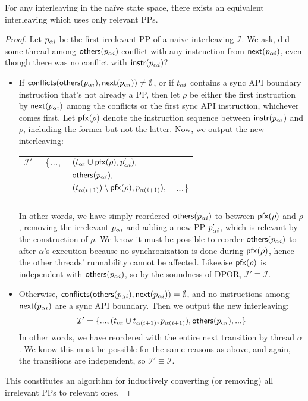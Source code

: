 \begin{lemma}
	For any interleaving in the na\"{i}ve state space, there exists an equivalent interleaving which uses only relevant PPs.
	\label{lem:equivalent}
\end{lemma}

\begin{proof}
	Let $p_{\alpha{}i}$ be the first irrelevant PP of a naive interleaving $\mathcal{I}$.
	We ask, did some thread among $\mathsf{others}(p_{\alpha{}i})$ conflict with any instruction from $\mathsf{next}(p_{\alpha{}i})$, even though there was no conflict with $\mathsf{instr}(p_{\alpha{}i})$?
	\begin{itemize}
		\item If $\mathsf{conflicts}(\mathsf{others}(p_{\alpha{}i}),\mathsf{next}(p_{\alpha{}i})) \ne \emptyset$, or if $t_{\alpha{}i}$ contains a sync API boundary instruction that's not already a PP,
			then let $\rho$ be either the first instruction by $\mathsf{next}(p_{\alpha{}i})$ among the conflicts or the first sync API instruction, whichever comes first.
			Let $\mathsf{pfx}(\rho)$ denote the instruction sequence between $\mathsf{instr}(p_{\alpha{}i})$ and $\rho$, including the former but not the latter.
			Now, we output the new interleaving:

			\begin{tabular}{lll}
				\\
				$\mathcal{I}' = \{...,$&$(t_{\alpha{}i} \cup \mathsf{pfx}(\rho), p_{\alpha{}i}'),$& \\
									   &$\mathsf{others}(p_{\alpha{}i}),$& \\
					       &$(t_{\alpha{}(i+1)}) \setminus \mathsf{pfx}(\rho), p_{\alpha{}(i+1)}),$ & $ ...\}$ \\
				\\
			\end{tabular}

			In other words, we have simply reordered $\mathsf{others}(p_{\alpha{}i})$ to between $\mathsf{pfx}(\rho)$ and $\rho$, removing the irrelevant $p_{\alpha{}i}$ and adding a new PP $p_{\alpha{}i}'$, which is relevant by the construction of $\rho$.
			We know it must be possible to reorder $\mathsf{others}(p_{\alpha{}i})$ to after $\alpha$'s execution because no synchronization is done during $\mathsf{pfx}(\rho)$, hence the other threads' runnability cannot be affected.
			Likewise $\mathsf{pfx}(\rho)$ is independent with $\mathsf{others}(p_{\alpha{}i})$, so by the soundness of DPOR, $\mathcal{I}' \equiv \mathcal{I}$.
		\item Otherwise, $\mathsf{conflicts}(\mathsf{others}(p_{\alpha{}i}),\mathsf{next}(p_{\alpha{}i})) = \emptyset$, and no instructions among $\mathsf{next}(p_{\alpha{}i})$ are a sync API boundary.
			Then we output the new interleaving:
			\[
				\mathcal{I}' = \{..., (t_{\alpha{}i} \cup t_{\alpha(i+1)}, p_{\alpha(i+1)}), \mathsf{others}(p_{\alpha{}i}),...\}
			\]
			In other words, we have reordered {\ppothers{\pai}} with the entire next transition by thread $\alpha$.
			We know this must be possible for the same reasons as above, and again, the transitions are independent, so $\mathcal{I}' \equiv \mathcal{I}$.
	\end{itemize}
	This constitutes an algorithm for inductively converting (or removing) all irrelevant PPs to relevant ones.
\end{proof}

